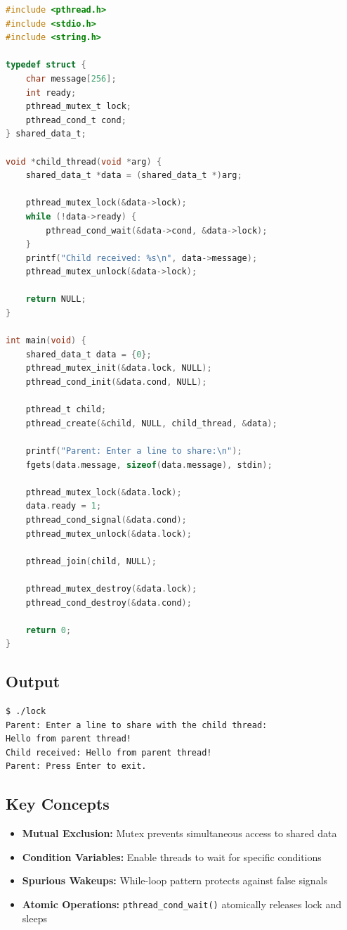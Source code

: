 \documentclass[12pt,a4paper]{article}
\begin{document}
\begin{lstlisting}[language=C, caption={Milestone 2: Mutex and Condition Variable}]
#include <pthread.h>
#include <stdio.h>
#include <string.h>

typedef struct {
    char message[256];
    int ready;
    pthread_mutex_t lock;
    pthread_cond_t cond;
} shared_data_t;

void *child_thread(void *arg) {
    shared_data_t *data = (shared_data_t *)arg;
    
    pthread_mutex_lock(&data->lock);
    while (!data->ready) {
        pthread_cond_wait(&data->cond, &data->lock);
    }
    printf("Child received: %s\n", data->message);
    pthread_mutex_unlock(&data->lock);
    
    return NULL;
}

int main(void) {
    shared_data_t data = {0};
    pthread_mutex_init(&data.lock, NULL);
    pthread_cond_init(&data.cond, NULL);
    
    pthread_t child;
    pthread_create(&child, NULL, child_thread, &data);
    
    printf("Parent: Enter a line to share:\n");
    fgets(data.message, sizeof(data.message), stdin);
    
    pthread_mutex_lock(&data.lock);
    data.ready = 1;
    pthread_cond_signal(&data.cond);
    pthread_mutex_unlock(&data.lock);
    
    pthread_join(child, NULL);
    
    pthread_mutex_destroy(&data.lock);
    pthread_cond_destroy(&data.cond);
    
    return 0;
}
\end{lstlisting}

\subsection{Output}
\begin{tcolorbox}[colback=green!5!white,colframe=green!75!black,title=Program Output]
\begin{verbatim}
$ ./lock
Parent: Enter a line to share with the child thread:
Hello from parent thread!
Child received: Hello from parent thread!
Parent: Press Enter to exit.
\end{verbatim}
\end{tcolorbox}

\subsection{Key Concepts}
\begin{itemize}[leftmargin=*]
    \item \textbf{Mutual Exclusion:} Mutex prevents simultaneous access to shared data
    \item \textbf{Condition Variables:} Enable threads to wait for specific conditions
    \item \textbf{Spurious Wakeups:} While-loop pattern protects against false signals
    \item \textbf{Atomic Operations:} \texttt{pthread\_cond\_wait()} atomically releases lock and sleeps
\end{itemize}
\end{document}
